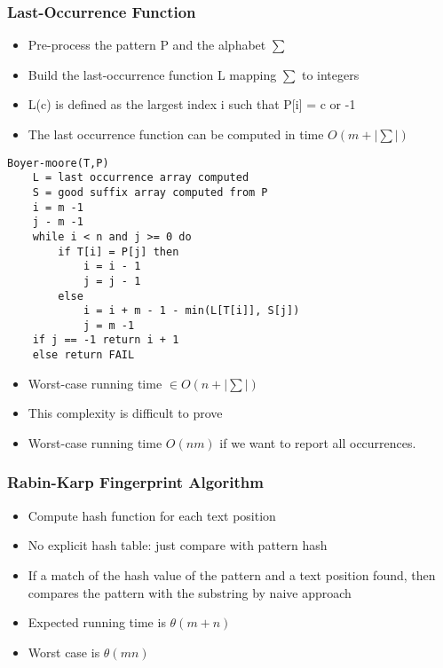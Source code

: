 \documentclass{article}
\begin{document}
\subsubsection*{Last-Occurrence Function}
\begin{itemize}
\item Pre-process the pattern P and the alphabet \(\sum\)
\item Build the last-occurrence function L mapping \(\sum\) to integers 
\item L(c) is defined as the largest index i such that P[i] = c or -1 
\item The last occurrence function can be computed in time \(O(m + \mid \sum \mid ) \)
\end{itemize}

\begin{lstlisting}
Boyer-moore(T,P)
	L = last occurrence array computed
	S = good suffix array computed from P
	i = m -1
	j - m -1
	while i < n and j >= 0 do
		if T[i] = P[j] then 
			i = i - 1
			j = j - 1
		else 
			i = i + m - 1 - min(L[T[i]], S[j])
			j = m -1
	if j == -1 return i + 1
	else return FAIL 
\end{lstlisting}

\begin{itemize}
\item Worst-case running time \(\in O(n +  \mid \sum \mid )\)
\item This complexity is difficult to prove
\item Worst-case running time \(O(nm)\) if we want to report all occurrences. 
\end{itemize}

\subsubsection*{Rabin-Karp Fingerprint Algorithm}
\begin{itemize}
\item Compute hash function for each text position
\item No explicit hash table: just compare with pattern hash
\item If a match of the hash value of the pattern and a text position found,
then compares the pattern with the substring by naive approach
\item Expected running time is \(\theta(m + n)\)
\item Worst case is \(\theta(mn)\)
\end{itemize}
\end{document}
